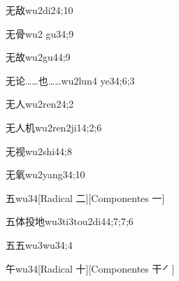 \begin{verbete}{无敌}{wu2di2}{4;10}
\end{verbete}

\begin{verbete}{无骨}{wu2 gu3}{4;9}
\end{verbete}

\begin{verbete}{无故}{wu2gu4}{4;9}
\end{verbete}

\begin{verbete}{无论……也……}{wu2lun4 ye3}{4;6;3}
\end{verbete}

\begin{verbete}{无人}{wu2ren2}{4;2}
\end{verbete}

\begin{verbete}{无人机}{wu2ren2ji1}{4;2;6}
\end{verbete}

\begin{verbete}{无视}{wu2shi4}{4;8}
\end{verbete}

\begin{verbete}{无氧}{wu2yang3}{4;10}
\end{verbete}

\begin{verbete}{五}{wu3}{4}[Radical 二][Componentes 一]
\end{verbete}

\begin{verbete}{五体投地}{wu3ti3tou2di4}{4;7;7;6}
\end{verbete}

\begin{verbete}{五五}{wu3wu3}{4;4}
\end{verbete}

\begin{verbete}{午}{wu3}{4}[Radical 十][Componentes 干㇒]
\end{verbete}

